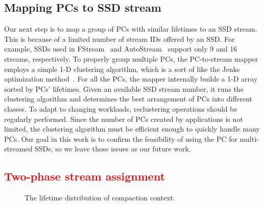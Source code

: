 \vspace{-5pt}
\subsection{Mapping PCs to SSD stream}
Our next step is to map a group of PCs with similar lifetimes to an SSD stream.
This is because of a limited number of stream IDs offered by an SSD. For
example, SSDs used in FStream~\cite{FStream} and AutoStream~\cite{AutoStream}
support only 9 and 16 streams, respectively. To properly group multiple PCs,
the PC-to-stream mapper employs a simple 1-D clustering algorithm, which is a
sort of like the Jenks optimization method~\cite{Jenks}.  For all the PCs, the
mapper internally builds a 1-D array sorted by PCs' lifetimes.  Given an
available SSD stream number, it runs the clustering algorithm and determines
the best arrangement of PCs into different classes.  To adapt to changing
workloads, reclustering operations should be regularly performed. Since the
number of PCs created by applications is not limited, the clustering algorithm
must be efficient enough to quickly handle many PCs. Our goal in this work is
to confirm the feasibility of using the PC for multi-streamed SSDs, so we leave
those issues as our future work.


\vspace{-5pt}
\subsection{\textcolor{red}{Two-phase stream assignment}}
\begin{figure}[!t]
\centering
\hspace{1pt}
\hfill
\vspace{-10pt}
\vspace{-10pt}
\caption{The lifetime distribution of compaction context.} 
\label{fig:compaction}
\vspace{-15pt}
\end{figure}

